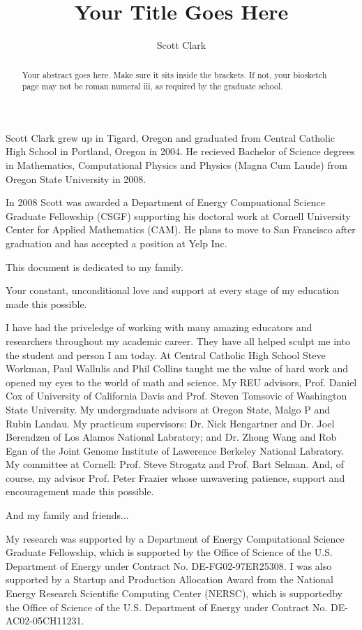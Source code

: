 \documentclass[phd,tocprelim]{cornell}
\title {Your Title Goes Here}
\author {Scott Clark}
\begin{document}
\maketitle
\makecopyright

\begin{abstract}
Your abstract goes here. Make sure it sits inside the brackets. If not,
your biosketch page may not be roman numeral iii, as required by the
graduate school.
\end{abstract}

\begin{biosketch}
Scott Clark grew up in Tigard, Oregon and graduated from Central Catholic High School in Portland, Oregon in 2004. He recieved Bachelor of Science degrees in Mathematics, Computational Physics and Physics (Magna Cum Laude) from Oregon State University in 2008.

In 2008 Scott was awarded a Department of Energy Compuational Science Graduate Fellowship (CSGF) supporting his doctoral work at Cornell University Center for Applied Mathematics (CAM). He plans to move to San Francisco after graduation and has accepted a position at Yelp Inc.
\end{biosketch}

\begin{dedication}
This document is dedicated to my family.

Your constant, unconditional love and support at every stage of my education made this possible.
\end{dedication}

\begin{acknowledgements}
I have had the priveledge of working with many amazing educators and researchers throughout my academic career. They have all helped sculpt me into the student and person I am today. At Central Catholic High School Steve Workman, Paul Wallulis and Phil Collins taught me the value of hard work and opened my eyes to the world of math and science. My REU advisors, Prof. Daniel Cox of University of California Davis and Prof. Steven Tomsovic of Washington State University. My undergraduate advisors at Oregon State, Malgo P and Rubin Landau. My practicum supervisors: Dr. Nick Hengartner and Dr. Joel Berendzen of Los Alamos National Labratory; and Dr. Zhong Wang and Rob Egan of the Joint Genome Institute of Lawerence Berkeley National Labratory. My committee at Cornell: Prof. Steve Strogatz and Prof. Bart Selman. And, of course, my advisor Prof. Peter Frazier whose unwavering patience, support and encouragement made this possible.

And my family and friends...

My research was supported by a Department of Energy Computational Science Graduate Fellowship, which is supported by the Office of Science of the U.S. Department of Energy under Contract No. DE-FG02-97ER25308. I was also supported by a Startup and Production Allocation Award from the National Energy Research Scientific Computing Center (NERSC), which is supportedby the Office of Science of the U.S. Department of Energy under Contract No. DE-AC02-05CH11231.
\end{acknowledgements}
\end{document}
